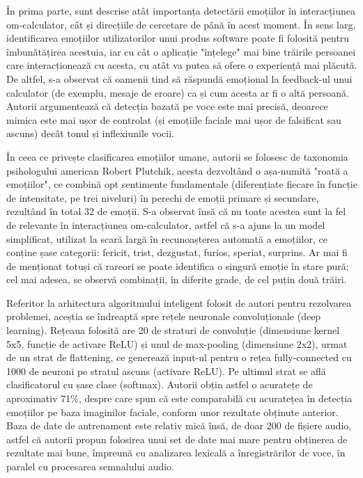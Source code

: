 \documentclass{article}
\begin{document}
În prima parte, sunt descrise atât importanța detectării emoțiilor în interacțiunea om-calculator, cât și direcțiile de cercetare de până în acest moment. În sens larg, identificarea emoțiilor utilizatorilor unui produs software poate fi folosită pentru îmbunătățirea acestuia, iar cu cât o aplicație "înțelege" mai bine trăirile persoanei care interacționează cu acesta, cu atât va putea să ofere o experiență mai plăcută. De altfel, s-a observat că oamenii tind să răspundă emoțional la feedback-ul unui calculator (de exemplu, mesaje de eroare) ca și cum acesta ar fi o altă persoană. Autorii argumentează că detecția bazată pe voce este mai precisă, deoarece mimica este mai ușor de controlat (și emoțiile faciale mai ușor de falsificat sau ascuns) decât tonul și inflexiunile vocii. 

În ceea ce privește clasificarea emoțiilor umane, autorii se folosesc de taxonomia psihologului american Robert Plutchik, acesta dezvoltând o așa-numită "roată a emoțiilor", ce combină opt sentimente fundamentale (diferențiate fiecare în funcție de intensitate, pe trei niveluri) în perechi de emoții primare și secundare, rezultând în total 32 de emoții. S-a observat însă că nu toate acestea sunt la fel de relevante în interacțiunea om-calculator, astfel că s-a ajuns la un model simplificat, utilizat la scară largă în recunoașterea automată a emoțiilor, ce conține șase categorii: fericit, trist, dezgustat, furios, speriat, surprins. Ar mai fi de menționat totuși că rareori se poate identifica o singură emoție în stare pură; cel mai adesea, se observă combinații, în diferite grade, de cel puțin două trăiri.

Referitor la arhitectura algoritmului inteligent folosit de autori pentru rezolvarea problemei, aceștia se îndreaptă spre rețele neuronale convoluționale (deep learning). Rețeaua folosită are 20 de straturi de convoluție (dimensiune kernel 5x5, funcție de activare ReLU) și unul de max-pooling (dimensiune 2x2), urmat de un strat de flattening, ce generează input-ul pentru o rețea fully-connected cu 1000 de neuroni pe stratul ascuns (activare ReLU). Pe ultimul strat se află clasificatorul cu șase clase (softmax). Autorii obțin astfel o acuratețe de aproximativ 71\%, despre care spun că este comparabilă cu acuratețea în detecția emoțiilor pe baza imaginilor faciale, conform unor rezultate obținute anterior. Baza de date de antrenament este relativ mică însă, de doar 200 de fișiere audio, astfel că autorii propun folosirea unui set de date mai mare pentru obținerea de rezultate mai bune, împreună cu analizarea lexicală a înregistrărilor de voce, în paralel cu procesarea semnalului audio.
\end{document}

